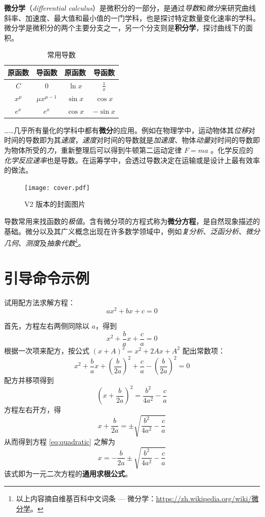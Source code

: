 \documentclass[
    10pt,
    oneside,
    openany,
    b5paper,
    colorscheme = black  %
]{qyxf-book}
\begin{document}
\textbf{微分学}（\emph{differential calculus}）是微积分的一部分，是通过\emph{导数}和\emph{微分}来研究曲线斜率、加速度、最大值和最小值的一门学科，也是探讨特定数量变化速率的学科。微分学是微积分的两个主要分支之一，另一个分支则是\textbf{积分学}，探讨曲线下的面积。


\begin{table}[htbp]
\centering
\caption{常用导数}
\begin{tabular}{cccc}
\toprule
\textbf{原函数} & \textbf{导函数} & \textbf{原函数} & \textbf{导函数} \\
\midrule
$C$ & $0$ & $\ln x$ & $\frac{1}{x}$ \\
$x^\mu$ & $\mu x^{\mu - 1}$ & $\sin x$ & $\cos x$ \\
$e^x$ & $e^x$ & $\cos x$ & $-\sin x$ \\
\bottomrule
\end{tabular}
\end{table}

……几乎所有量化的学科中都有\textbf{微分}的应用。例如在物理学中，运动物体其\emph{位移}对时间的导数即为其\emph{速度}，\emph{速度}对时间的导数就是\emph{加速度}、物体\emph{动量}对时间的导数即为物体所受的\emph{力}，重新整理后可以得到牛顿第二运动定律 $F=ma$ 。化学反应的\emph{化学反应速率}也是导数。在运筹学中，会透过导数决定在运输或是设计上最有效率的做法。

\begin{figure}[htbp]
\centering
\texttt{[image: cover.pdf]}
\caption{V2 版本的封面图片}
\label{fig:qyxf-logo}
\end{figure}

导数常用来找函数的\emph{极值}。含有微分项的方程式称为\textbf{微分方程}，是自然现象描述的基础。微分以及其广义概念出现在许多数学领域中，例如\emph{复分析}、\emph{泛函分析}、\emph{微分几何}、\emph{测度}及\emph{抽象代数}\footnote{以上内容摘自维基百科中文词条 --- 微分学：\url{https://zh.wikipedia.org/wiki/微分学}。}。

\section{引导命令示例}

 试用配方法求解方程：
\begin{equation}\label{eq:quadratic}
ax^2 + bx + c = 0
\end{equation}

\solve 首先，方程左右两侧同除以 $a$，得到
\[ x^2 + \frac bax + \frac ca = 0 \]
根据一次项来配方，按公式 $(x+A)^2=x^2+2Ax+A^2$ 配出常数项：
\[ x^2 + \frac bax + \left(\frac b{2a}\right)^2 + \frac ca - \left(\frac b{2a}\right)^2 = 0 \]
配方并移项得到
\[ \left(x + \frac b{2a}\right)^2 = \frac {b^2}{4a^2} - \frac ca \]
方程左右开方，得
\[ x + \frac b{2a} = \pm \sqrt{\frac {b^2}{4a^2} - \frac ca} \]
从而得到方程 \eqref{eq:quadratic} 之解为
\begin{equation}
x = - \frac b{2a} \pm \sqrt{\frac {b^2}{4a^2} - \frac ca}
\end{equation}
该式即为一元二次方程的\textbf{通用求根公式}。
\end{document}
